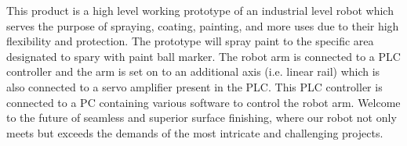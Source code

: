This product is a high level working prototype of an industrial level robot which serves the purpose of spraying, coating, painting, and more uses due to their high flexibility and protection. The prototype will spray paint to the specific area designated to spary with paint ball marker. The robot arm is connected to a PLC controller and the arm is set on to an additional axis (i.e. linear rail) which is also connected to a servo amplifier present in the PLC. This PLC controller is connected to a PC containing various software to control the robot arm. Welcome to the future of seamless and superior surface finishing, where our robot not only meets but exceeds the demands of the most intricate and challenging projects.